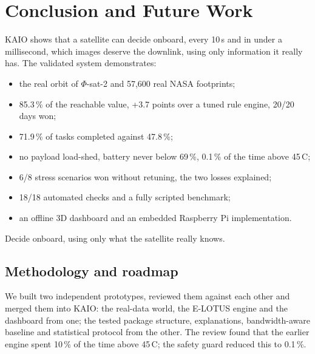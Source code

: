 \documentclass[11pt,a4paper]{article}
\begin{document}
\section{Conclusion and Future Work}
KAIO shows that a satellite can decide onboard, every 10\,s and in under a millisecond, which images
deserve the downlink, using only information it really has. The validated system demonstrates:
\begin{itemize}
  \item the real orbit of $\Phi$-sat-2 and 57,600 real NASA footprints;
  \item 85.3\,\% of the reachable value, +3.7 points over a tuned rule engine, 20/20 days won;
  \item 71.9\,\% of tasks completed against 47.8\,\%;
  \item no payload load-shed, battery never below 69\,\%, 0.1\,\% of the time above 45\,\textdegree C;
  \item 6/8 stress scenarios won without retuning, the two losses explained;
  \item 18/18 automated checks and a fully scripted benchmark;
  \item an offline 3D dashboard and an embedded Raspberry Pi implementation.
\end{itemize}

\begin{resultbox}
\large Decide onboard, using only what the satellite really knows.
\end{resultbox}

\subsection*{Methodology and roadmap}
We built two independent prototypes, reviewed them against each other and merged them into KAIO: the
real-data world, the E-LOTUS engine and the dashboard from one; the tested package structure,
explanations, bandwidth-aware baseline and statistical protocol from the other. The review found that the
earlier engine spent 10\,\% of the time above 45\,\textdegree C; the safety guard reduced this to 0.1\,\%.
\end{document}
